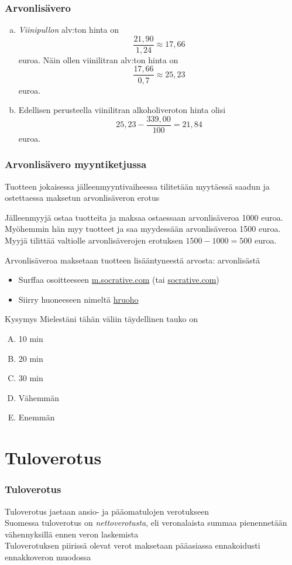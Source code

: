 \documentclass[]{beamer}\usepackage[]{graphicx}\usepackage[]{color}
\newcommand{\pblock}{\\ \vspace{0.5cm}\pause}
\newcommand{\socrativeOhje}{
\begin{itemize}
\item Surffaa osoitteeseen \url{m.socrative.com} (tai \url{socrative.com})
\item Siirry huoneeseen nimeltä \url{hruoho}
\end{itemize}
}
\newcommand{\taukoKysymys}{
\socrativeOhje
	\begin{block}{Kysymys}
	Mielestäni tähän väliin täydellinen tauko on
	\begin{enumerate}[(A)]
		\item 10 min
		\item 20 min
		\item 30 min
		\item Vähemmän 
		\item Enemmän
	\end{enumerate}	
	\end{block}
}
\begin{document}
\begin{frame}
\frametitle{Arvonlisävero}

	\begin{ratkaisu}
		\pause
		\begin{enumerate}[(a)]
			\item \emph{Viinipullon} alv:ton hinta on\pause 
				\[
					\frac{21,90}{1,24}\approx 17,66
				\]
				euroa. \pause Näin ollen viinilitran alv:ton hinta on 
				\[
					\frac{17,66}{0,7}\approx 25,23
				\] euroa.\pause
			\item Edellisen perusteella viinilitran alkoholiveroton hinta olisi \pause
				\[
					25,23-\frac{339,00}{100} = 21,84
				\]
				euroa.
		\end{enumerate}
	\end{ratkaisu}
\end{frame}

\begin{frame}
\frametitle{Arvonlisävero myyntiketjussa}

Tuotteen jokaisessa jälleenmyyntivaiheessa tilitetään myytäessä saadun ja  ostettaessa maksetun arvonlisäveron erotus\pause
\begin{esim}
Jälleenmyyjä ostaa tuotteita ja maksaa ostaessaan arvonlisäveroa 1000 euroa.
\pause Myöhemmin hän myy tuotteet ja saa myydessään arvonlisäveroa 1500 euroa.
\pause Myyjä tilittää valtiolle arvonlisäverojen erotuksen \(1500-1000=500\) euroa.
\end{esim}\pause
Arvonlisäveroa maksetaan tuotteen lisääntyneestä arvosta: arvonlisästä
\end{frame}

\begin{frame}
\taukoKysymys
\end{frame}

\section{Tuloverotus}

\begin{frame}
  \frametitle{Tuloverotus}
  \pause
  Tuloverotus jaetaan ansio- ja pääomatulojen verotukseen
  \pblock
  Suomessa tuloverotus on \emph{nettoverotusta}, eli veronalaista summaa pienennetään vähennyksillä ennen veron laskemista 
  \pblock
  Tuloverotuksen piirissä olevat verot maksetaan pääasiassa ennakoidusti ennakkoveron muodossa
\end{frame}
\end{document}
